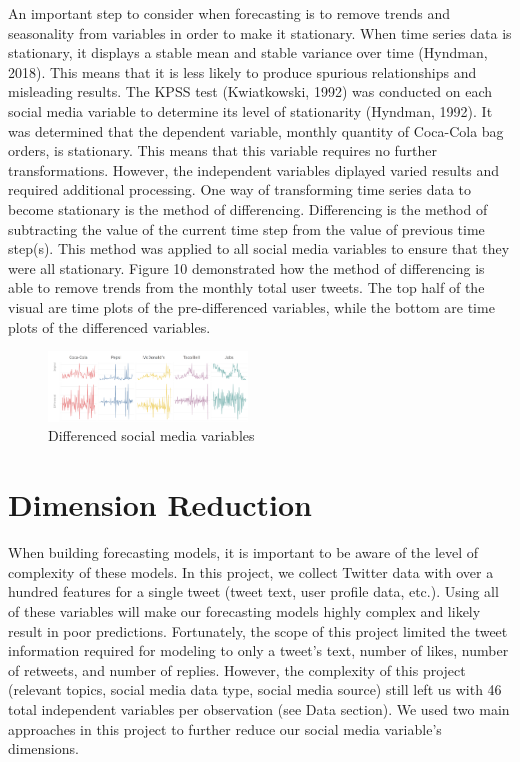 \documentclass[12pt,oneside]{chicagocapstone}
\begin{document}
An important step to consider when forecasting is to remove trends and seasonality from variables in order to make it stationary. When time series data is stationary, it displays a stable mean and stable variance over time (Hyndman, 2018). This means that it is less likely to produce spurious relationships and misleading results. The KPSS test (Kwiatkowski, 1992) was conducted on each social media variable to determine its level of stationarity (Hyndman, 1992). It was determined that the dependent variable, monthly quantity of Coca-Cola bag orders, is stationary. This means that this variable requires no further transformations. However, the independent variables diplayed varied results and required additional processing. One way of transforming time series data to become stationary is the method of differencing. Differencing is the method of subtracting the value of the current time step from the value of previous time step(s). This method was applied to all social media variables to ensure that they were all stationary. Figure 10 demonstrated how the method of differencing is able to remove trends from the monthly total user tweets. The top half of the visual are time plots of the pre-differenced variables, while the bottom are time plots of the differenced variables.
\begin{figure}

{\centering \includegraphics[width=200px,angle = 0, scale=2.1]{figure/differencing} 

}

\caption{Differenced social media variables}\label{fig:differencing}
\end{figure}
\hypertarget{dimension-reduction}{%
\section*{Dimension Reduction}\label{dimension-reduction}}

When building forecasting models, it is important to be aware of the level of complexity of these models. In this project, we collect Twitter data with over a hundred features for a single tweet (tweet text, user profile data, etc.). Using all of these variables will make our forecasting models highly complex and likely result in poor predictions. Fortunately, the scope of this project limited the tweet information required for modeling to only a tweet's text, number of likes, number of retweets, and number of replies. However, the complexity of this project (relevant topics, social media data type, social media source) still left us with 46 total independent variables per observation (see Data section). We used two main approaches in this project to further reduce our social media variable's dimensions.
\end{document}
